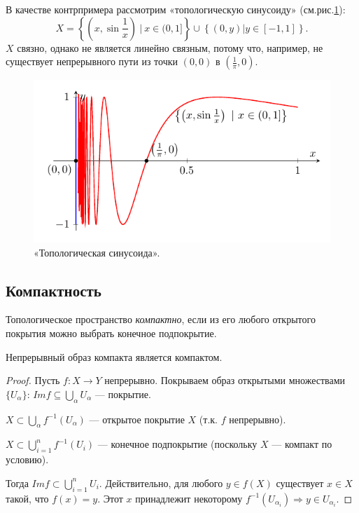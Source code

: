 \begin{example}
    В качестве контрпримера рассмотрим «топологическую синусоиду» (см.рис.\ref{fig:c2.2}):
    \[X = \left\{\left(x, \sin{\frac{1}{x}}\right) \ |\ x \in (0,1]\right\} \cup \left\{(0,y) | y \in [-1,1]\right\}.\]
    $X$ связно, однако не является линейно связным, потому что, например, не существует непрерывного пути из точки $(0,0)$ в $(\frac{1}{\pi}, 0)$.

    \begin{figure}[htbp]
        \centering
        \includegraphics[scale=1]{images/c2.2.pdf}
        \caption{«Топологическая синусоида».}
        \label{fig:c2.2}
    \end{figure}
\end{example}


\subsection{Компактность}
\begin{definition}
    Топологическое пространство \textit{компактно}, если из его любого открытого покрытия можно выбрать конечное подпокрытие.
\end{definition}

\begin{statement}
    Непрерывный образ компакта является компактом.
\end{statement}
\begin{proof}
    Пусть $f: X \to Y$ непрерывно. Покрываем образ открытыми множествами $\{U_{\alpha}\}$: $Im f \subseteq \bigcup\limits_{\alpha} U_{\alpha}$ — покрытие.

    $X \subset \bigcup\limits_{\alpha} f^{-1}(U_{\alpha})$ — открытое покрытие $X$ (т.к. $f$ непрерывно).

    $X \subset \bigcup\limits_{i = 1}^{n} f^{-1}(U_{i})$ — конечное подпокрытие (поскольку $X$ — компакт по условию).

    Тогда $Im f \subset \bigcup\limits_{i = 1}^n U_{i}$. Действительно, для любого $y \in f(X)$ существует $x \in X$ такой, что $f(x) = y$. Этот $x$ принадлежит некоторому $f^{-1}(U_{\alpha_i}) \Longrightarrow y \in U_{\alpha_i}$.
\end{proof}

